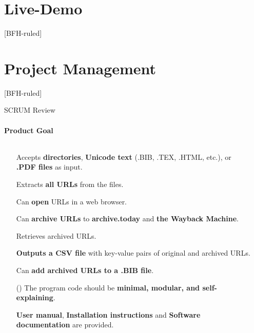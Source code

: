 \documentclass[
ngerman,%
authorontitle=true,
]{bfhbeamer}
\begin{document}
	\section{Live-Demo}
	[BFH-ruled]
	\frame{\sectionpage}
	
	\section{Project Management}
	[BFH-ruled]
	\frame{\sectionpage}
	
	\begin{frame}{SCRUM Review}
		\framesubtitle{Product Goal}
		\begin{columns} %
			\begin{column}{0.8\textwidth} %
				\begin{itemize}
					\item[\checkmark] Accepts \textbf{directories}, \textbf{Unicode text} (.BIB, .TEX, .HTML, etc.), or \textbf{.PDF files} as input.
					\item[\checkmark] Extracts \textbf{all URLs} from the files.
					\item[\checkmark] Can \textbf{open} URLs in a web browser.
					\item[\checkmark] Can \textbf{archive URLs} to \textbf{archive.today} and \textbf{the Wayback Machine}.
					\item[\checkmark] Retrieves archived URLs.
					\item[\checkmark] \textbf{Outputs a CSV file} with key-value pairs of original and archived URLs.
					\item[\checkmark] Can \textbf{add archived URLs to a .BIB file}.
					\item[(\checkmark)] The program code should be \textbf{minimal, modular, and self-explaining}.
					\item[\checkmark] \textbf{User manual}, \textbf{Installation instructions} and \textbf{Software documentation} are provided.
				\end{itemize}
			\end{column}
			\begin{column}{0.2\textwidth} %
			\end{column}
		\end{columns} %
	\end{frame}
	
\end{document}
